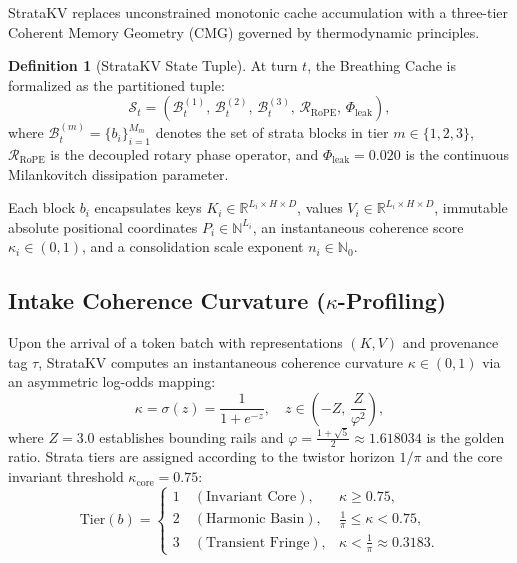 \documentclass[11pt,letterpaper]{article}
\theoremstyle{definition}
\newtheorem{definition}{Definition}
\begin{document}
StrataKV replaces unconstrained monotonic cache accumulation with a three-tier Coherent Memory Geometry (CMG) governed by thermodynamic principles.

\begin{definition}[StrataKV State Tuple]
At turn $t$, the Breathing Cache is formalized as the partitioned tuple:
\begin{equation}
    \mathcal{S}_t = \left( \mathcal{B}_t^{(1)}, \, \mathcal{B}_t^{(2)}, \, \mathcal{B}_t^{(3)}, \, \mathcal{R}_{\text{RoPE}}, \, \Phi_{\text{leak}} \right),
\end{equation}
where $\mathcal{B}_t^{(m)} = \{ b_{i} \}_{i=1}^{M_m}$ denotes the set of strata blocks in tier $m \in \{1, 2, 3\}$, $\mathcal{R}_{\text{RoPE}}$ is the decoupled rotary phase operator, and $\Phi_{\text{leak}} = 0.020$ is the continuous Milankovitch dissipation parameter.
\end{definition}

Each block $b_i$ encapsulates keys $K_i \in \mathbb{R}^{L_i \times H \times D}$, values $V_i \in \mathbb{R}^{L_i \times H \times D}$, immutable absolute positional coordinates $P_i \in \mathbb{N}^{L_i}$, an instantaneous coherence score $\kappa_i \in (0, 1)$, and a consolidation scale exponent $n_i \in \mathbb{N}_0$.

\subsection{Intake Coherence Curvature (\texorpdfstring{$\kappa$}{kappa}-Profiling)}
Upon the arrival of a token batch with representations $(K, V)$ and provenance tag $\tau$, StrataKV computes an instantaneous coherence curvature $\kappa \in (0, 1)$ via an asymmetric log-odds mapping:
\begin{equation}
    \kappa = \sigma(z) = \frac{1}{1 + e^{-z}}, \quad z \in \left(-Z, \, \frac{Z}{\varphi^2}\right),
\end{equation}
where $Z = 3.0$ establishes bounding rails and $\varphi = \frac{1 + \sqrt{5}}{2} \approx 1.618034$ is the golden ratio. Strata tiers are assigned according to the twistor horizon $1/\pi$ and the core invariant threshold $\kappa_{\text{core}} = 0.75$:
\begin{equation}
    \text{Tier}(b) = 
    \begin{cases}
        1 \quad (\text{Invariant Core}), & \kappa \ge 0.75, \\
        2 \quad (\text{Harmonic Basin}), & \frac{1}{\pi} \le \kappa < 0.75, \\
        3 \quad (\text{Transient Fringe}), & \kappa < \frac{1}{\pi} \approx 0.3183.
    \end{cases}
\end{equation}
\end{document}
